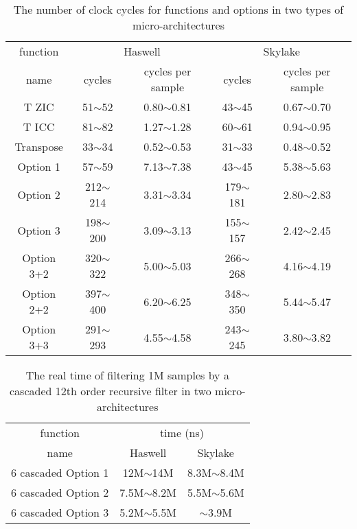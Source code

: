 \begin{table}[t]
    \caption{The number of clock cycles for functions and options in two types of micro-architectures}  %
    \centering %
    \setlength{\tabcolsep}{1.6pt}
    \begin{tabular}{c|c|c|c|c} %
    \hline\hline %
    function & \multicolumn{2}{c|}{Haswell} & \multicolumn{2}{c}{Skylake} \\ [0.3ex]
    \cline{2-5}
    name & cycles & cycles per sample & cycles & cycles per sample \\ [0.3ex] %
    \hline
    T ZIC & 51$\sim$52 & 0.80$\sim$0.81 & 43$\sim$45 & 0.67$\sim$0.70 \\ [0.3ex]
    T ICC & 81$\sim$82 & 1.27$\sim$1.28 & 60$\sim$61 & 0.94$\sim$0.95 \\ [0.3ex]
    Transpose & 33$\sim$34 & 0.52$\sim$0.53 & 31$\sim$33 & 0.48$\sim$0.52 \\ [0.3ex]
    Option 1 & 57$\sim$59 & 7.13$\sim$7.38 & 43$\sim$45 & 5.38$\sim$5.63 \\ [0.3ex]
    Option 2 & 212$\sim$214 & 3.31$\sim$3.34 & 179$\sim$181 & 2.80$\sim$2.83 \\ [0.3ex]
    Option 3 & 198$\sim$200 & 3.09$\sim$3.13 & 155$\sim$157 & 2.42$\sim$2.45 \\ [0.3ex]
    Option 3+2 & 320$\sim$322 & 5.00$\sim$5.03 & 266$\sim$268 & 4.16$\sim$4.19 \\ [0.3ex]
    Option 2+2 & 397$\sim$400 & 6.20$\sim$6.25 & 348$\sim$350 & 5.44$\sim$5.47 \\ [0.3ex]
    Option 3+3 & 291$\sim$293 & 4.55$\sim$4.58 & 243$\sim$245 & 3.80$\sim$3.82 \\ [1ex]
    \hline
    \end{tabular}
    \label{table:number_of_instructions_in_clock_cycles} %
\end{table}


\begin{table}[t]
    \caption{The real time of filtering 1M samples by a cascaded 12th order recursive filter in two micro-architectures}  %
    \centering %
    \begin{tabular}{c|c|c} %
    \hline\hline %
    function & \multicolumn{2}{c}{time (ns)} \\ [0.3ex]
    \cline{2-3}
    name & Haswell & Skylake \\ [0.3ex] %
    \hline
    6 cascaded Option 1 & 12M$\sim$14M & 8.3M$\sim$8.4M  \\ [0.3ex]
    6 cascaded Option 2 & 7.5M$\sim$8.2M & 5.5M$\sim$5.6M  \\ [0.3ex]
    6 cascaded Option 3 & 5.2M$\sim$5.5M & $\sim$3.9M  \\ [0.3ex]
    \hline
    \end{tabular}
    \label{table:real_time_filtering_1M} %
\end{table}

